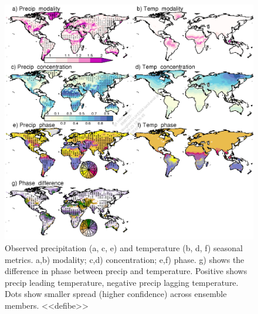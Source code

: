 \documentclass[bg, manuscript]{copernicus}
\begin{document}
\begin{figure}[t]
    \includegraphics[width=12cm]{figs/Climate/climStuff-Observations.png}
    \caption{Observed precipitation (a, c, e) and temperature (b, d, f) seasonal metrics. a,b) modality; c,d) concentration; e,f) phase. g) shows the difference in phase between precip and temperature. Positive shows precip leading temperature, negative precip lagging temperature. Dots show smaller spread (higher confidence) across ensemble members. <<defibe>> \label{fig:ClimateSeasonObsMaps}}
\end{figure}
\end{document}
